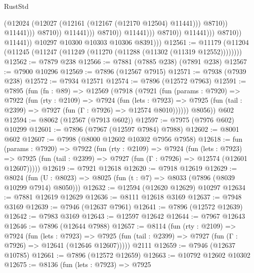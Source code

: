 \begin{lexlean}{RustStd}
\begin{coremodule}
                                                        (@12024
                                                          (@12027
                                                            (@12161
                                                              (@12167 (@12170 @12504) @11441)))
                                                          @8710))
                                                      @11441)))
                                                @8710))
                                            @11441)))
                                      @8710))
                                  @11441)))
                            @8710))
                        @11441)))
                  @8710))
              @11441))
          @10297
          @10300
          @10303
          @10306
          @8391)))
@12561 := @11179 (@11204 (@11245 (@11247 (@11249 (@11270 (@11288 (@11302 (@11319 @12552))))))))
@12562 := @7879 @238
@12566 := @7881 (@7885 @238) (@7891 @238)
@12567 := @7900 @10296
@12569 := @7896 (@12567 @7915)
@12571 := @7938 (@7939 @238)
@12572 := @7934 @12571
@12574 := @7896 (@12572 @7963)
@12591 := @7895
    (fun (fn : @89) =>
    @12569
      (@7918
        (@7921
          (fun (params : @7920) =>
          @7922
            (fun (rty : @2109) =>
            @7924
              (fun (lets : @7923) =>
              @7925 (fun (tail : @2399) => @7927 (fun (Γ : @7926) => @12574 @8010))))))
        @8056))
    @602
@12594 := @8062 (@12567 (@7913 @602))
@12597 := @7975 (@7976 @602) @10299
@12601 := @7896 (@7967 (@12597 @7984) @7988)
@12602 := @8001 @602
@12607 := @7998 (@8000 @12602 @10302 @7956 @7958)
@12618 := fun (params : @7920) =>
  @7922
    (fun (rty : @2109) =>
    @7924
      (fun (lets : @7923) =>
      @7925 (fun (tail : @2399) => @7927 (fun (Γ : @7926) => @12574 (@12601 @12607)))))
@12619 := @7921 @12618
@12620 := @7918 @12619
@12629 := @8024
    (fun (U : @8023) => @8025 (fun (t : @7) => @8033 (@7896 (@8039 @10299 @7914) @8050)))
@12632 := @12594 (@12620 @12629) @10297
@12634 := @7881 @12619 @12629
@12636 := @8111 @12618 @3169
@12637 := @7948 @3169
@12639 := @7946 (@12637 @7961)
@12641 := @7896 (@12572 @12639)
@12642 := @7983 @3169
@12643 := @12597 @12642
@12644 := @7967 @12643
@12646 := @7896 (@12644 @7988)
@12657 := @8114
    (fun (rty : @2109) =>
    @7924
      (fun (lets : @7923) =>
      @7925 (fun (tail : @2399) => @7927 (fun (Γ : @7926) => @12641 (@12646 @12607)))))
    @2111
@12659 := @7946 (@12637 @10785)
@12661 := @7896 (@12572 @12659)
@12663 := @10792 @12602 @10302
@12675 := @8136
    (fun (lets : @7923) =>
    @7925

\end{coremodule}
\end{lexlean}
